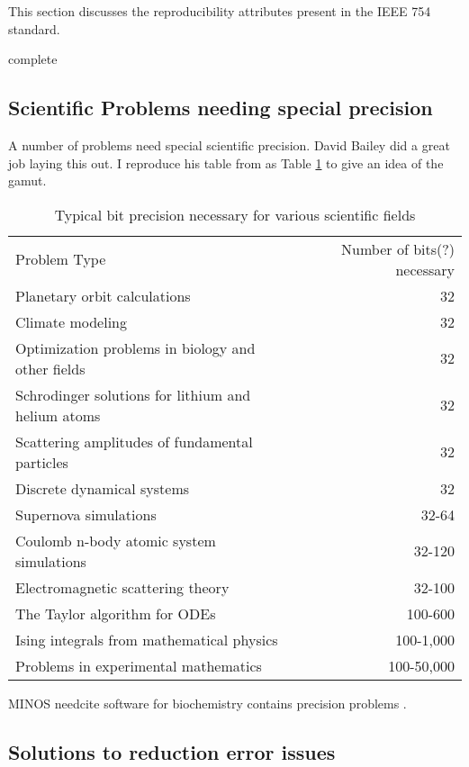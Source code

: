 \documentclass{article}
\newcommand{\complete}{
	\gls{complete}
}
\newcommand{\needcite}{
	\gls{needcite}
}
\begin{document}
This section discusses the reproducibility attributes present in the IEEE 754 standard. \cite{ieee-754-2008}

\complete

\subsection{Scientific Problems needing special precision}

A number of problems need special scientific precision. David Bailey did a great job laying this out\cite{high-precision-arith-in-science,dhb-zurich-hp}. I reproduce his table from \cite{dhb-zurich-hp} as Table \ref{tab:precision} to give an idea of the gamut.

\FloatBarrier
\begin{table}[t]
\caption{Typical bit precision necessary for various scientific fields}\label{tab:precision}
\begin{tabular}{lr}
Problem Type & Number of bits(?) necessary \\
Planetary orbit calculations & 32 \\
Climate modeling & 32 \\
Optimization problems in biology and other fields & 32\\
Schrodinger solutions for lithium and helium atoms & 32\\
Scattering amplitudes of fundamental particles & 32\\
Discrete dynamical systems & 32\\
Supernova simulations & 32-64 \\
Coulomb n-body atomic system simulations & 32-120\\
Electromagnetic scattering theory & 32-100\\
The Taylor algorithm for ODEs & 100-600\\
Ising integrals from mathematical physics & 100-1,000\\
Problems in experimental mathematics & 100-50,000\\
\end{tabular}
\end{table}
\FloatBarrier

MINOS \needcite software for biochemistry contains precision problems \cite{dhb-zurich-hp}.

\subsection{Solutions to reduction error issues}
\end{document}
